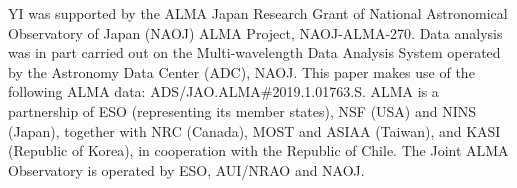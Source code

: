 \documentclass[twocolumn]{aastex631}
\begin{document}
\begin{acknowledgments}
YI was supported by the ALMA Japan Research Grant of National Astronomical Observatory of Japan (NAOJ) ALMA Project, NAOJ-ALMA-270. Data analysis was in part carried out on the Multi-wavelength Data Analysis System operated by the Astronomy Data Center (ADC), NAOJ. This paper makes use of the following ALMA data: ADS/JAO.ALMA\#2019.1.01763.S. ALMA is a partnership of ESO (representing its member states), NSF (USA) and NINS (Japan), together with NRC (Canada), MOST and ASIAA (Taiwan), and KASI (Republic of Korea), in cooperation with the Republic of Chile. The Joint ALMA Observatory is operated by ESO, AUI/NRAO and NAOJ.
\end{acknowledgments}

\vspace{5mm}


{}

\end{document}
